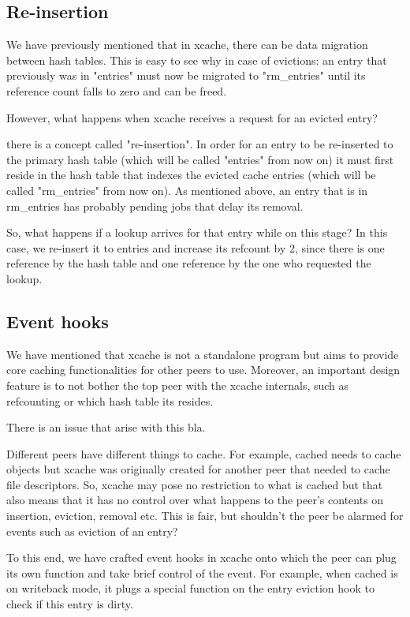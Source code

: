 \subsection{Re-insertion}

We have previously mentioned that in xcache, there can be data migration 
between hash tables. This is easy to see why in case of evictions: an entry 
that previously was in "entries" must now be migrated to "rm\_entries" until 
its reference count falls to zero and can be freed.

However, what happens when xcache receives a request for an evicted entry? 

there is a concept called "re-insertion".  In order for an entry to
be re-inserted to the primary hash table (which will be called "entries" from
now on) it must first reside in the hash table that indexes the evicted cache
entries (which will be called "rm\_entries" from now on). As mentioned above,
an entry that is in rm\_entries has probably pending jobs that delay its
removal.

So, what happens if a lookup arrives for that entry while on this stage? In
this case, we re-insert it to entries and increase its refcount by 2, since
there is one reference by the hash table and one reference by the one who
requested the lookup.

\subsection{Event hooks}

We have mentioned that xcache is not a standalone program but aims to provide 
core caching functionalities for other peers to use. Moreover, an important 
design feature is to not bother the top peer with the xcache internals, such as 
refcounting or which hash table its resides.

There is an issue that arise with this bla.

Different peers have different things to cache. For example, cached needs to 
cache objects but xcache was originally created for another peer that needed to 
cache file descriptors. So, xcache may pose no restriction to what is cached but 
that also means that it has no control over what happens to the peer's contents 
on insertion, eviction, removal etc. This is fair, but shouldn't the peer be 
alarmed for events such as eviction of an entry?

To this end, we have crafted event hooks in xcache onto which the peer can plug 
its own function and take brief control of the event. For example, when cached 
is on writeback mode, it plugs a special function on the entry eviction hook to 
check if this entry is dirty.

